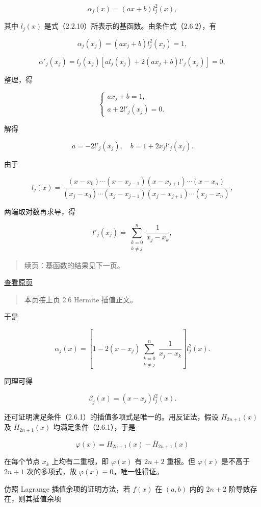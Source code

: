 \documentclass[
  10pt,
  fontset=fandol]{ctexart}
\begin{document}
\[\alpha_j(x)=(ax+b)l_j^2(x),\]

其中 \(l_j(x)\) 是式（2.2.10）所表示的基函数。由条件式（2.6.2），有

\[\alpha_j(x_j)=(ax_j+b)l_j^2(x_j)=1,\]

\[\alpha'_j(x_j)=l_j(x_j)[al_j(x_j)+2(ax_j+b)l'_j(x_j)]=0,\]

整理，得

\[\begin{cases}ax_j+b=1,\\a+2l'_j(x_j)=0.\end{cases}\]

解得

\[a=-2l'_j(x_j),\quad b=1+2x_jl'_j(x_j).\]

由于

\[l_j(x)=\frac{(x-x_0)\cdots(x-x_{j-1})(x-x_{j+1})\cdots(x-x_n)}{(x_j-x_0)\cdots(x_j-x_{j-1})(x_j-x_{j+1})\cdots(x_j-x_n)},\]

两端取对数再求导，得

\[l'_j(x_j)=\sum_{\substack{k=0\\k\ne j}}^{n}\frac{1}{x_j-x_k},\]

\begin{quote}
续页：基函数的结果见下一页。
\end{quote}

\href{../../source-images/pdf-044.jpeg}{查看原页}

\begin{quote}
本页接上页 2.6 Hermite 插值正文。
\end{quote}

于是

\[\alpha_j(x)=\left[1-2(x-x_j)\sum_{\substack{k=0\\k\ne j}}^n\frac{1}{x_j-x_k}\right]l_j^2(x).\tag{2.6.4}\]

同理可得

\[\beta_j(x)=(x-x_j)l_j^2(x).\tag{2.6.5}\]

还可证明满足条件（2.6.1）的插值多项式是唯一的。用反证法，假设 \(H_{2n+1}(x)\) 及 \(\overline H_{2n+1}(x)\) 均满足条件（2.6.1），于是

\[\varphi(x)=H_{2n+1}(x)-\overline H_{2n+1}(x)\]

在每个节点 \(x_k\) 上均有二重根，即 \(\varphi(x)\) 有 \(2n+2\) 重根。但 \(\varphi(x)\) 是不高于 \(2n+1\) 次的多项式，故 \(\varphi(x)\equiv0\)。唯一性得证。

仿照 Lagrange 插值余项的证明方法，若 \(f(x)\) 在 \((a,b)\) 内的 \(2n+2\) 阶导数存在，则其插值余项
\end{document}
